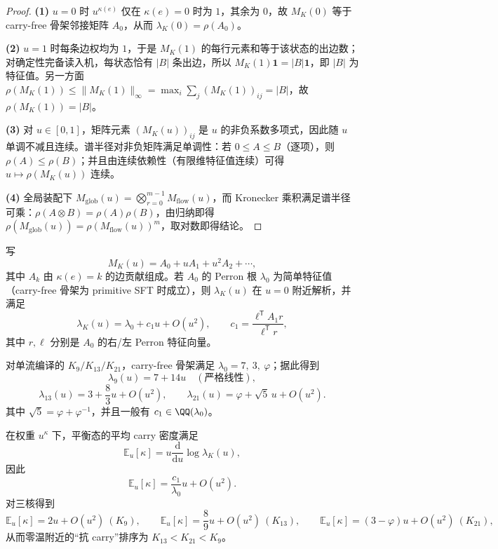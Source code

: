 \begin{proof}
\textbf{(1)} $u=0$ 时 $u^{\kappa(e)}$ 仅在 $\kappa(e)=0$ 时为 $1$，其余为 $0$，故 $M_K(0)$ 等于 carry-free 骨架邻接矩阵 $A_0$，从而 $\lambda_K(0)=\rho(A_0)$。

\textbf{(2)} $u=1$ 时每条边权均为 $1$，于是 $M_K(1)$ 的每行元素和等于该状态的出边数；对确定性完备读入机，每状态恰有 $|B|$ 条出边，所以 $M_K(1)\mathbf{1}=|B|\mathbf{1}$，即 $|B|$ 为特征值。另一方面 $\rho(M_K(1))\le \|M_K(1)\|_{\infty}=\max_i\sum_j (M_K(1))_{ij}=|B|$，故 $\rho(M_K(1))=|B|$。

\textbf{(3)} 对 $u\in[0,1]$，矩阵元素 $(M_K(u))_{ij}$ 是 $u$ 的非负系数多项式，因此随 $u$ 单调不减且连续。谱半径对非负矩阵满足单调性：若 $0\le A\le B$（逐项），则 $\rho(A)\le \rho(B)$；并且由连续依赖性（有限维特征值连续）可得 $u\mapsto \rho(M_K(u))$ 连续。

\textbf{(4)} 全局装配下 $M_{\mathrm{glob}}(u)=\bigotimes_{r=0}^{m-1} M_{\mathrm{flow}}(u)$，而 Kronecker 乘积满足谱半径可乘：$\rho(A\otimes B)=\rho(A)\rho(B)$，由归纳即得 $\rho(M_{\mathrm{glob}}(u))=\rho(M_{\mathrm{flow}}(u))^m$，取对数即得结论。
\end{proof}

\begin{proposition}[零温附近的线性响应不变量]\label{prop:lambda-linear-response}
写
\[
M_K(u)=A_0+uA_1+u^2A_2+\cdots,
\]
其中 $A_k$ 由 $\kappa(e)=k$ 的边贡献组成。若 $A_0$ 的 Perron 根 $\lambda_0$ 为简单特征值（carry-free 骨架为 primitive SFT 时成立），则 $\lambda_K(u)$ 在 $u=0$ 附近解析，并满足
\[
\lambda_K(u)=\lambda_0+c_1u+O(u^2),
\qquad
c_1=\frac{\ell^{\mathsf T}A_1 r}{\ell^{\mathsf T}r},
\]
其中 $r,\ell$ 分别是 $A_0$ 的右/左 Perron 特征向量。
\end{proposition}

\begin{corollary}[三核的精确一阶系数]\label{cor:lambda-linear-response-kernels}
对单流编译的 $K_9/K_{13}/K_{21}$，carry-free 骨架满足
\(
\lambda_0=7,\ 3,\ \varphi
\)；据此得到
\[
\lambda_{9}(u)=7+14u\quad(\text{严格线性}),
\]
\[
\lambda_{13}(u)=3+\frac{8}{3}u+O(u^2),
\qquad
\lambda_{21}(u)=\varphi+\sqrt5\,u+O(u^2).
\]
其中 $\sqrt5=\varphi+\varphi^{-1}$，并且一般有 $c_1\in\QQ(\lambda_0)$。
\end{corollary}

\begin{corollary}\label{cor:kappa-linear-response-order}
在权重 $u^{\kappa}$ 下，平衡态的平均 carry 密度满足
\[
\mathbb{E}_u[\kappa]=u\frac{\mathrm{d}}{\mathrm{d}u}\log\lambda_K(u),
\]
因此
\[
\mathbb{E}_u[\kappa]=\frac{c_1}{\lambda_0}u+O(u^2).
\]
对三核得到
\[
\mathbb{E}_u[\kappa]=2u+O(u^2)\ (K_9),\qquad
\mathbb{E}_u[\kappa]=\frac{8}{9}u+O(u^2)\ (K_{13}),\qquad
\mathbb{E}_u[\kappa]=(3-\varphi)u+O(u^2)\ (K_{21}),
\]
从而零温附近的“抗 carry”排序为 $K_{13}<K_{21}<K_{9}$。
\end{corollary}

